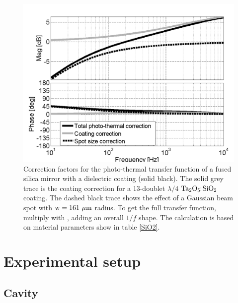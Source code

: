 \begin{figure}[ht]
\includegraphics[width=\columnwidth]{figures/photothermal/FigOT1.png}%
\caption{Correction factors for the photo-thermal transfer function of a fused silica mirror with a dielectric coating (solid black). The solid grey trace is the coating correction for a 13-doublet $\lambda/4$ $\rm Ta_2O_5\!\!:\!SiO_2$ coating. The dashed black trace shows the effect of a Gaussian beam spot with ${\rm w}=161~\mu{\rm m}$ radius. To get the full transfer function, multiply with , adding an overall $1/f$ shape.
The calculation is based on material parameters show in table \ref{SiO2}. 
}%
\label{fig:PTcorr}%
\end{figure}

\section{Experimental setup}
\label{sec:exp}

\subsection{Cavity}


